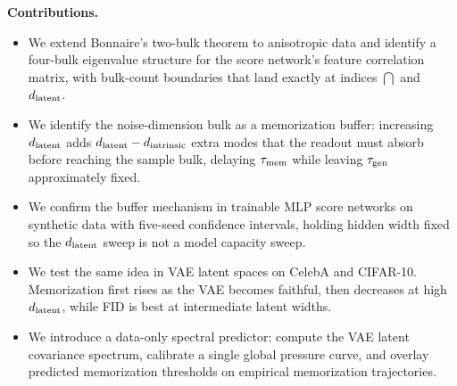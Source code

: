 \textbf{Contributions.}
\begin{itemize}\itemsep1pt
  \item We extend Bonnaire's two-bulk theorem to anisotropic data
    and identify a four-bulk eigenvalue structure for the score
    network's feature correlation matrix, with bulk-count
    boundaries that land exactly at indices $\dint$ and $d_{\mathrm{latent}}$.
  \item We identify the noise-dimension bulk as a memorization
    buffer: increasing $d_{\mathrm{latent}}$ adds $d_{\mathrm{latent}} - d_{\mathrm{intrinsic}}$ extra modes
    that the readout must absorb before reaching the sample bulk,
    delaying $\tau_{\mathrm{mem}}$ while leaving $\tau_{\mathrm{gen}}$ approximately
    fixed.
  \item We confirm the buffer mechanism in trainable MLP score
    networks on synthetic data with five-seed confidence intervals,
    holding hidden width fixed so the $d_{\mathrm{latent}}$ sweep is not a model
    capacity sweep.
  \item We test the same idea in VAE latent spaces on CelebA and
    CIFAR-10. Memorization first rises as the VAE becomes faithful,
    then decreases at high $d_{\mathrm{latent}}$, while FID is best at
    intermediate latent widths.
  \item We introduce a data-only spectral predictor: compute the
    VAE latent covariance spectrum, calibrate a single global
    pressure curve, and overlay predicted memorization thresholds on
    empirical memorization trajectories.
\end{itemize}
